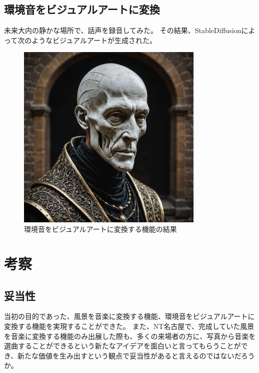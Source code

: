 \section{環境音をビジュアルアートに変換}
未来大内の静かな場所で、話声を録音してみた。
その結果、StableDiffusionによって次のようなビジュアルアートが生成された。
\begin{figure}[h]
  \centering
  \includegraphics[width=0.8\textwidth]{pages/report/images/output_image.jpeg}
  \caption{環境音をビジュアルアートに変換する機能の結果}
  \label{fig:environmental-sound-to-visual-art}
\end{figure}

\chapter{考察}
\section{妥当性}
当初の目的であった、風景を音楽に変換する機能、環境音をビジュアルアートに変換する機能を実現することができた。
また、NT名古屋で、完成していた風景を音楽に変換する機能のみ出展した際も、多くの来場者の方に、写真から音楽を選曲することができるという新たなアイデアを面白いと言ってもらうことができ、新たな価値を生み出すという観点で妥当性があると言えるのではないだろうか。

